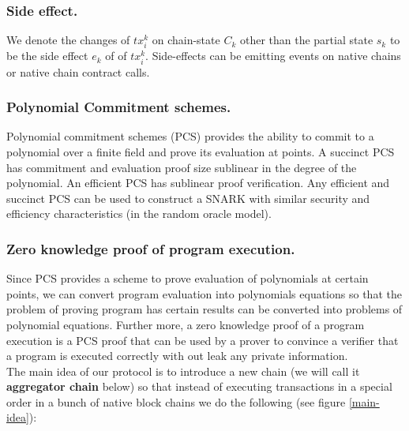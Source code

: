 \documentclass[pageno]{jpaper}
\begin{document}
\subsubsection{Side effect.}
We denote the changes of $tx_i^k$ on chain-state $C_k$ other than the partial state $s_k$ to be the side effect $e_k$ of of $tx_i^k$. Side-effects can be emitting events on native chains or native chain contract calls.
\\
\subsubsection{Polynomial Commitment schemes.}
Polynomial commitment schemes (PCS) provides the ability to commit to a polynomial over a finite field and prove its evaluation at points\cite{boneh2021halo}. A succinct PCS has commitment and evaluation proof size sublinear in the degree of the polynomial. An efficient PCS has sublinear proof verification. Any efficient and succinct PCS can be used to construct a SNARK with similar security and efficiency characteristics (in the random oracle model).
\\
\subsubsection{Zero knowledge proof of program execution.}
Since PCS provides a scheme to prove evaluation of polynomials at certain points, we can convert program evaluation into polynomials equations so that the problem of proving program has certain results can be converted into problems of polynomial equations. Further more, a zero knowledge proof of a program execution is a PCS proof that can be used by a prover to convince a verifier that a program is executed correctly with out leak any private information.\\
\newline
The main idea of our protocol is to introduce a new chain (we will call it {\bf aggregator chain} below) so that instead of executing transactions in a special order in a bunch of native block chains we do the following (see figure \ref{main-idea}):
\end{document}
